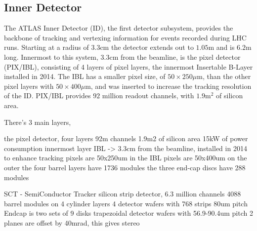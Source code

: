 
\subsection{Inner Detector}

The ATLAS Inner Detector (ID), the first detector subsystem, provides the backbone of tracking and vertexing information for events recorded during LHC runs. Starting at a radius of $3.3\text{cm}$ the detector extends out to $1.05\text{m}$ and is $6.2\text{m}$ long. Innermost to this system, $3.3\text{cm}$ from the beamline, is the pixel detector (PIX/IBL), consisting of 4 layers of pixel layers, the innermost Insertable B-Layer installed in 2014. The IBL has a smaller pixel size, of $50\times250\mu\text{m}$, than the other pixel layers with $50\times400\mu\text{m}$, and was inserted to increase the tracking resolution of the ID. PIX/IBL provides $92$ million readout channels, with $1.9\text{m}^{2}$ of silicon area.



There's 3 main layers, 

the pixel detector,
    four layers
    92m channels
    1.9m2 of silicon area
    15kW of power consumption
    innermost layer IBL -> 3.3cm from the beamline, installed in 2014 to enhance tracking
    pixels are 50x250um in the IBL
    pixels are 50x400um on the outer 
    the four barrel layers have 1736 modules
    the three end-cap discs have 288 modules

SCT - SemiConductor Tracker
    silicon strip detector, 6.3 million channels
    4088 barrel modules on 4 cylinder layers
    4 detector wafers with 768 strips
    80um pitch
    Endcap is two sets of 9 disks
        trapezoidal detector wafers with 56.9-90.4um pitch
    2 planes are offset by 40mrad, this gives stereo


